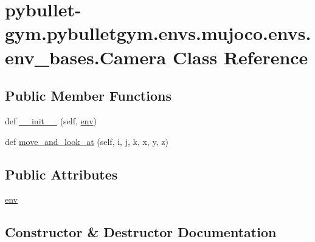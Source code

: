 \hypertarget{classpybullet-gym_1_1pybulletgym_1_1envs_1_1mujoco_1_1envs_1_1env__bases_1_1_camera}{}\section{pybullet-\/gym.pybulletgym.\+envs.\+mujoco.\+envs.\+env\+\_\+bases.\+Camera Class Reference}
\label{classpybullet-gym_1_1pybulletgym_1_1envs_1_1mujoco_1_1envs_1_1env__bases_1_1_camera}
\subsection*{Public Member Functions}
\begin{DoxyCompactItemize}
\item 
def \hyperlink{classpybullet-gym_1_1pybulletgym_1_1envs_1_1mujoco_1_1envs_1_1env__bases_1_1_camera_af69afb24a34ecb0b858459041bc0c681}{\+\_\+\+\_\+init\+\_\+\+\_\+} (self, \hyperlink{classpybullet-gym_1_1pybulletgym_1_1envs_1_1mujoco_1_1envs_1_1env__bases_1_1_camera_a768976121cf4e420859358847202b02f}{env})
\item 
def \hyperlink{classpybullet-gym_1_1pybulletgym_1_1envs_1_1mujoco_1_1envs_1_1env__bases_1_1_camera_acc087155f3481eea623462afb1de3ba4}{move\+\_\+and\+\_\+look\+\_\+at} (self, i, j, k, x, y, z)
\end{DoxyCompactItemize}
\subsection*{Public Attributes}
\begin{DoxyCompactItemize}
\item 
\hyperlink{classpybullet-gym_1_1pybulletgym_1_1envs_1_1mujoco_1_1envs_1_1env__bases_1_1_camera_a768976121cf4e420859358847202b02f}{env}
\end{DoxyCompactItemize}


\subsection{Constructor \& Destructor Documentation}
